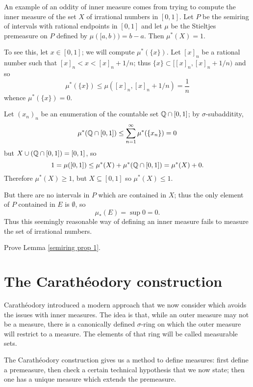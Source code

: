 \begin{example}
An example of an oddity of inner measure comes from trying to compute the inner measure of the set $X$ of irrational numbers in $[0, 1]$.
Let $P$ be the semiring of intervals with rational endpoints in $[0, 1]$ and let $\mu$ be the Stieltjes premeasure on $P$ defined by $\mu([a, b)) = b - a$.
Then $\mu^*(X) = 1$.

To see this, let $x \in [0, 1]$; we will compute $\mu^*(\{x\})$. Let $[x]_n$ be a rational number such that $[x]_n < x < [x]_n + 1/n$; thus $\{x\} \subset [[x]_n, [x]_n + 1/n)$ and so
\[\mu^*(\{x\}) \leq \mu([x]_n, [x]_n + 1/n) = \frac{1}{n}\]
whence $\mu^*(\{x\}) = 0$.

Let $(x_n)_n$ be an enumeration of the countable set $\mathbb{Q} \cap [0, 1]$; by $\sigma$-subadditity,
\[\mu^*(\mathbb{Q} \cap [0, 1]) \leq \sum_{n=1}^\infty \mu^*(\{x_n\}) = 0\]
but $X \cup (\mathbb{Q} \cap [0, 1]) = [0, 1]$, so
\[1 = \mu([0, 1]) \leq \mu^*(X) + \mu^*(\mathbb{Q} \cap [0, 1]) = \mu^*(X) + 0.\]
Therefore $\mu^*(X) \geq 1$, but $X \subseteq [0, 1]$ so $\mu^*(X) \leq 1$.

But there are no intervals in $P$ which are contained in $X$; thus the only element of $P$ contained in $E$ is $\emptyset$, so
\[\mu_*(E) = \sup 0 = 0.\]
Thus this seemingly reasonable way of defining an inner measure fails to measure the set of irrational numbers.
\end{example}

\begin{exercise}
\label{semiring exercise}
Prove Lemma \ref{semiring prop 1}.
\end{exercise}


\section{The Carathéodory construction}
Carathéodory introduced a modern approach that we now consider which avoids the issues with inner measures.
The idea is that, while an outer measure may not be a measure, there is a canonically defined $\sigma$-ring on which the outer measure will restrict to a measure.
The elements of that ring will be called measurable sets.

\begin{subsec}
The Carathéodory construction gives us a method to define measures: first define a premeasure, then check a certain technical hypothesis that we now state; then one has a unique measure which extends the premeasure.
\end{subsec}

